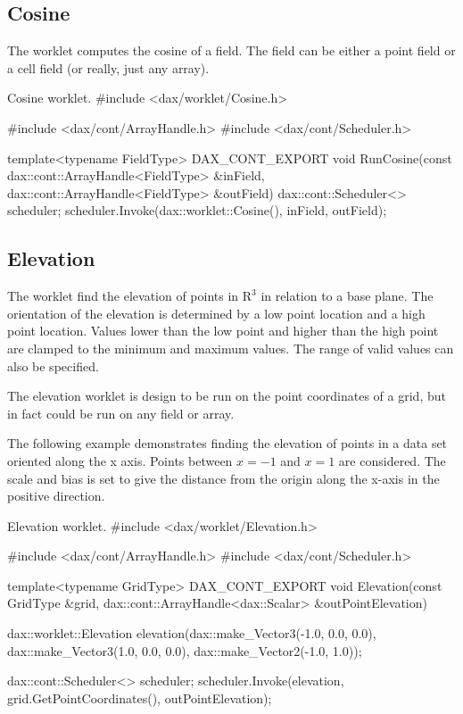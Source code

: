 \subsection{Cosine}

The  worklet computes the cosine of a field. The field
can be either a point field or a cell field (or really, just any array).

\begin{daxexample}{Cosine worklet.}
#include <dax/worklet/Cosine.h>

#include <dax/cont/ArrayHandle.h>
#include <dax/cont/Scheduler.h>

template<typename FieldType>
DAX_CONT_EXPORT
void RunCosine(const dax::cont::ArrayHandle<FieldType> &inField,
               dax::cont::ArrayHandle<FieldType> &outField)
{
  dax::cont::Scheduler<> scheduler;
  scheduler.Invoke(dax::worklet::Cosine(), inField, outField);
}
\end{daxexample}

\subsection{Elevation}

The  worklet find the elevation of points in
$\mathrm{R}^3$ in relation to a base plane. The orientation of the
elevation is determined by a low point location and a high point
location. Values lower than the low point and higher than the high point
are clamped to the minimum and maximum values. The range of valid values
can also be specified.

The elevation worklet is design to be run on the point coordinates of a
grid, but in fact could be run on any field or array.

The following example demonstrates finding the elevation of points in a
data set oriented along the x axis. Points between $x=-1$ and $x=1$ are
considered. The scale and bias is set to give the distance from the origin
along the x-axis in the positive direction.

\begin{daxexample}[ex:Elevation]{Elevation worklet.}
#include <dax/worklet/Elevation.h>

#include <dax/cont/ArrayHandle.h>
#include <dax/cont/Scheduler.h>

template<typename GridType>
DAX_CONT_EXPORT
void Elevation(const GridType &grid,
               dax::cont::ArrayHandle<dax::Scalar> &outPointElevation)
{
  dax::worklet::Elevation elevation(dax::make_Vector3(-1.0, 0.0, 0.0),
                                    dax::make_Vector3(1.0, 0.0, 0.0),
                                    dax::make_Vector2(-1.0, 1.0));

  dax::cont::Scheduler<> scheduler;
  scheduler.Invoke(elevation, grid.GetPointCoordinates(), outPointElevation);
}
\end{daxexample}

